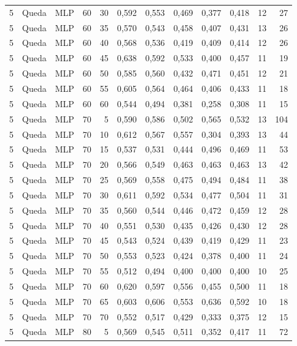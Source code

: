 \begin{longtable}{@{}rllrrrrrrrrr@{}}
5 & Queda & MLP & 60 & 30 & 0,592 & 0,553 & 0,469 & 0,377 & 0,418 & 12 & 27 \\
5 & Queda & MLP & 60 & 35 & 0,570 & 0,543 & 0,458 & 0,407 & 0,431 & 13 & 26 \\
5 & Queda & MLP & 60 & 40 & 0,568 & 0,536 & 0,419 & 0,409 & 0,414 & 12 & 26 \\
5 & Queda & MLP & 60 & 45 & 0,638 & 0,592 & 0,533 & 0,400 & 0,457 & 11 & 19 \\
5 & Queda & MLP & 60 & 50 & 0,585 & 0,560 & 0,432 & 0,471 & 0,451 & 12 & 21 \\
5 & Queda & MLP & 60 & 55 & 0,605 & 0,564 & 0,464 & 0,406 & 0,433 & 11 & 18 \\
5 & Queda & MLP & 60 & 60 & 0,544 & 0,494 & 0,381 & 0,258 & 0,308 & 11 & 15 \\
5 & Queda & MLP & 70 & 5 & 0,590 & 0,586 & 0,502 & 0,565 & 0,532 & 13 & 104 \\
5 & Queda & MLP & 70 & 10 & 0,612 & 0,567 & 0,557 & 0,304 & 0,393 & 13 & 44 \\
5 & Queda & MLP & 70 & 15 & 0,537 & 0,531 & 0,444 & 0,496 & 0,469 & 11 & 53 \\
5 & Queda & MLP & 70 & 20 & 0,566 & 0,549 & 0,463 & 0,463 & 0,463 & 13 & 42 \\
5 & Queda & MLP & 70 & 25 & 0,569 & 0,558 & 0,475 & 0,494 & 0,484 & 11 & 38 \\
5 & Queda & MLP & 70 & 30 & 0,611 & 0,592 & 0,534 & 0,477 & 0,504 & 11 & 31 \\
5 & Queda & MLP & 70 & 35 & 0,560 & 0,544 & 0,446 & 0,472 & 0,459 & 12 & 28 \\
5 & Queda & MLP & 70 & 40 & 0,551 & 0,530 & 0,435 & 0,426 & 0,430 & 12 & 28 \\
5 & Queda & MLP & 70 & 45 & 0,543 & 0,524 & 0,439 & 0,419 & 0,429 & 11 & 23 \\
5 & Queda & MLP & 70 & 50 & 0,553 & 0,523 & 0,424 & 0,378 & 0,400 & 11 & 24 \\
5 & Queda & MLP & 70 & 55 & 0,512 & 0,494 & 0,400 & 0,400 & 0,400 & 10 & 25 \\
5 & Queda & MLP & 70 & 60 & 0,620 & 0,597 & 0,556 & 0,455 & 0,500 & 11 & 18 \\
5 & Queda & MLP & 70 & 65 & 0,603 & 0,606 & 0,553 & 0,636 & 0,592 & 10 & 18 \\
5 & Queda & MLP & 70 & 70 & 0,552 & 0,517 & 0,429 & 0,333 & 0,375 & 12 & 15 \\
5 & Queda & MLP & 80 & 5 & 0,569 & 0,545 & 0,511 & 0,352 & 0,417 & 11 & 72 \\

\end{longtable}
